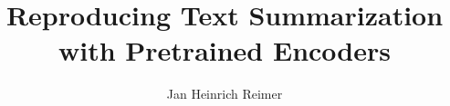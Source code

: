 \documentclass[english,acmlarge,nonacm,natbib=false,urlbreakonhyphens=false,screen,11pt]{acmart}
\title{Reproducing Text Summarization with Pretrained Encoders}
\author{Jan Heinrich Reimer}
\affiliation{
    \institution{Martin Luther University Halle-Wittenberg}
    \streetaddress{Von-Seckendorff-Platz~1}
    \postcode{06108}
    \city{Halle (Saale)}
    \country{Germany}
}
\begin{document}
\begin{abstract}
    
\end{abstract}

\maketitle







\printbibliography
\end{document}
